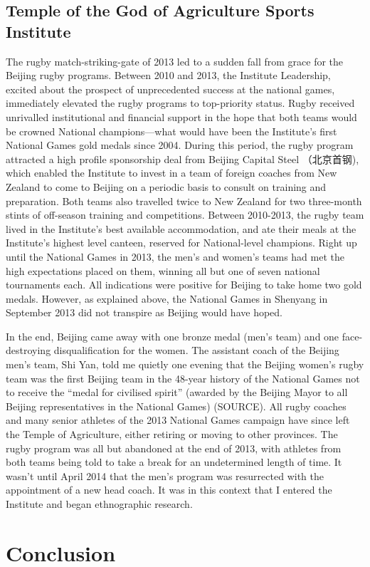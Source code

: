 \begin{CJK}{UTF8}{gbsn}
\subsection{Temple of the God of Agriculture Sports Institute}
The rugby match-striking-gate of 2013 led to a sudden fall from grace for the Beijing rugby programs.  Between 2010 and 2013, the Institute Leadership, excited about the prospect of unprecedented success at the national games,  immediately elevated the rugby programs to top-priority status.  Rugby received unrivalled institutional and financial support in the hope that both teams would be crowned National champions---what would have been the Institute's first National Games gold medals since 2004.  During this period, the rugby program attracted a high profile sponsorship deal from Beijing Capital Steel （北京首钢), which enabled the Institute to invest in a team of foreign coaches from New Zealand to come to Beijing on a periodic basis to consult on training and preparation. Both teams also travelled twice to New Zealand for two three-month stints of off-season training and competitions.  Between 2010-2013, the rugby team lived in the Institute's best available accommodation, and ate their meals at the Institute's highest level canteen, reserved for National-level champions.  Right up until the National Games in 2013, the men's and women's teams had met the high expectations placed on them, winning all but one of seven national tournaments each.  All indications were positive for Beijing to take home two gold medals.  However, as explained above, the National Games in Shenyang in September 2013 did not transpire as Beijing would have hoped.

In the end, Beijing came away with one bronze medal (men's team) and one face-destroying disqualification for the women.  The assistant coach of the Beijing men's team, Shi Yan, told me quietly one evening that the Beijing women's rugby team was the first Beijing team in the 48-year history of the National Games not to receive the ``medal for civilised spirit''  (awarded by the Beijing Mayor to all Beijing representatives in the National Games) (SOURCE).  All rugby coaches and many senior athletes of the 2013 National Games campaign have since left the Temple of Agriculture, either retiring or moving to other provinces.  The rugby program was all but abandoned at the end of 2013, with athletes from both teams being told to take a break for an undetermined length of time.  It wasn't until April 2014 that the men's program was resurrected with the appointment of a new head coach.  It was in this context that I entered the Institute and began ethnographic research.




\section{Conclusion}

                                                          \end{CJK}
